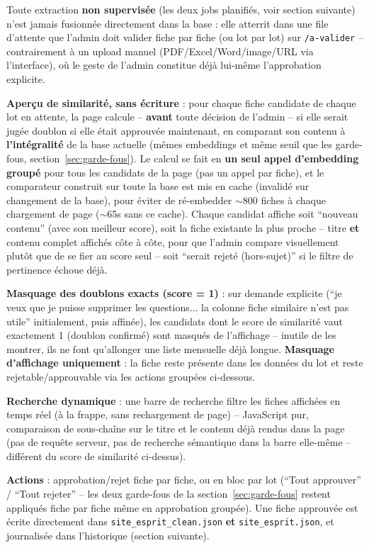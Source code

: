 \documentclass[11pt,a4paper]{report}
\begin{document}
Toute extraction \textbf{non supervisée} (les deux jobs planifiés, voir section
suivante) n'est jamais fusionnée directement dans la base : elle atterrit dans une file
d'attente que l'admin doit valider fiche par fiche (ou lot par lot) sur
\texttt{/a-valider} -- contrairement à un upload manuel (PDF/Excel/Word/image/URL via
l'interface), où le geste de l'admin constitue déjà lui-même l'approbation explicite.

\textbf{Aperçu de similarité, sans écriture} : pour chaque fiche candidate de chaque lot
en attente, la page calcule -- \textbf{avant} toute décision de l'admin -- si elle serait
jugée doublon si elle était approuvée maintenant, en comparant son contenu à
\textbf{l'intégralité} de la base actuelle (mêmes embeddings et même seuil que les
garde-fous, section~\ref{sec:garde-fous}). Le calcul se fait en \textbf{un seul appel
d'embedding groupé} pour tous les candidats de la page (pas un appel par fiche), et le
comparateur construit sur toute la base est mis en cache (invalidé sur changement de la
base), pour éviter de ré-embedder $\sim$800 fiches à chaque chargement de page
($\sim$65s sans ce cache). Chaque candidat affiche soit ``nouveau contenu'' (avec son
meilleur score), soit la fiche existante la plus proche -- titre \textbf{et} contenu
complet affichés côte à côte, pour que l'admin compare visuellement plutôt que de se
fier au score seul -- soit ``serait rejeté (hors-sujet)'' si le filtre de pertinence
échoue déjà.

\textbf{Masquage des doublons exacts (score = 1)} : sur demande explicite (``je veux que
je puisse supprimer les questions... la colonne fiche similaire n'est pas utile''
initialement, puis affinée), les candidats dont le score de similarité vaut exactement 1
(doublon confirmé) sont masqués de l'affichage -- inutile de les montrer, ils ne font
qu'allonger une liste mensuelle déjà longue. \textbf{Masquage d'affichage uniquement} :
la fiche reste présente dans les données du lot et reste rejetable/approuvable via les
actions groupées ci-dessous.

\textbf{Recherche dynamique} : une barre de recherche filtre les fiches affichées en
temps réel (à la frappe, sans rechargement de page) -- JavaScript pur, comparaison de
sous-chaîne sur le titre et le contenu déjà rendus dans la page (pas de requête serveur,
pas de recherche sémantique dans la barre elle-même -- différent du score de similarité
ci-dessus).

\textbf{Actions} : approbation/rejet fiche par fiche, ou en bloc par lot (``Tout
approuver'' / ``Tout rejeter'' -- les deux garde-fous de la section~\ref{sec:garde-fous}
restent appliqués fiche par fiche même en approbation groupée). Une fiche approuvée est
écrite directement dans \texttt{site\_esprit\_clean.json} \textbf{et}
\texttt{site\_esprit.json}, et journalisée dans l'historique (section suivante).
\end{document}
